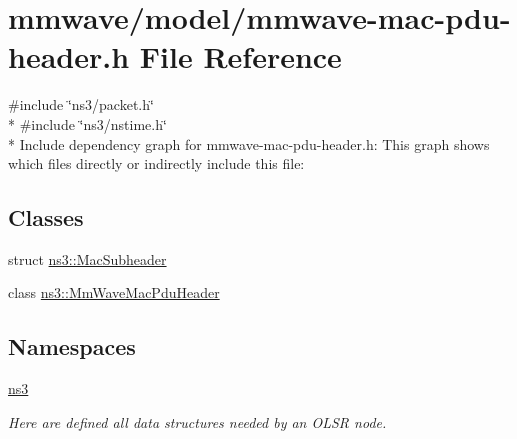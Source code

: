 \hypertarget{mmwave-mac-pdu-header_8h}{}\section{mmwave/model/mmwave-\/mac-\/pdu-\/header.h File Reference}
\label{mmwave-mac-pdu-header_8h}
{\ttfamily \#include \char`\"{}ns3/packet.\+h\char`\"{}}\\*
{\ttfamily \#include \char`\"{}ns3/nstime.\+h\char`\"{}}\\*
Include dependency graph for mmwave-\/mac-\/pdu-\/header.h\+:
This graph shows which files directly or indirectly include this file\+:
\subsection*{Classes}
\begin{DoxyCompactItemize}
\item 
struct \hyperlink{structns3_1_1MacSubheader}{ns3\+::\+Mac\+Subheader}
\item 
class \hyperlink{classns3_1_1MmWaveMacPduHeader}{ns3\+::\+Mm\+Wave\+Mac\+Pdu\+Header}
\end{DoxyCompactItemize}
\subsection*{Namespaces}
\begin{DoxyCompactItemize}
\item 
 \hyperlink{namespacens3}{ns3}
\begin{DoxyCompactList}\small\item\em Here are defined all data structures needed by an O\+L\+SR node. \end{DoxyCompactList}\end{DoxyCompactItemize}
